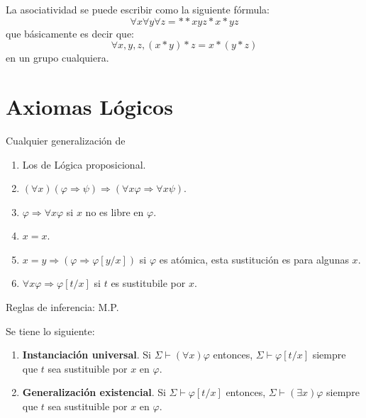 \documentclass[12pt]{report}
\theoremstyle{largebreak}
\begin{document}
    \begin{exa}
        La asociatividad se puede escribir como la siguiente fórmula:
        \begin{equation*}
            \forall x\forall y\forall z=**xyz*x*yz
        \end{equation*}
        que básicamente es decir que:
        \begin{equation*}
            \forall x,y,z, (x*y)*z=x*(y*z)
        \end{equation*}
        en un grupo cualquiera.
    \end{exa}

    \section{Axiomas Lógicos}

    Cualquier generalización de 
    \begin{enumerate}
        \item Los de Lógica proposicional.
        \item $(\forall x)(\varphi\Rightarrow \psi)\Rightarrow (\forall x\varphi\Rightarrow\forall x\psi)$.
        \item $\varphi\Rightarrow\forall x\varphi$ si $x$ no es libre en $\varphi$.
        \item $x=x$.
        \item $x=y\Rightarrow(\varphi\Rightarrow\varphi\left[y/x\right])$ si $\varphi$ es atómica, esta sustitución es para algunas $x$.
        \item $\forall x\varphi\Rightarrow\varphi\left[t/x \right]$ si $t$ es sustitubile por $x$.
    \end{enumerate}

    Reglas de inferencia: M.P.

    \begin{theor}
        Se tiene lo siguiente:
        \begin{enumerate}
            \item \textbf{Instanciación universal}. Si $\Sigma\vdash(\forall x)\varphi$ entonces, $\Sigma\vdash\varphi[t/x]$ siempre que $t$ sea sustituible por $x$ en $\varphi$.
            \item \textbf{Generalización existencial}. Si $\Sigma\vdash\varphi[t/x]$ entonces, $\Sigma\vdash\left(\exists x \right)\varphi$ siempre que $t$ sea sustituible por $x$ en $\varphi$.
        \end{enumerate}
    \end{theor}
\end{document}
